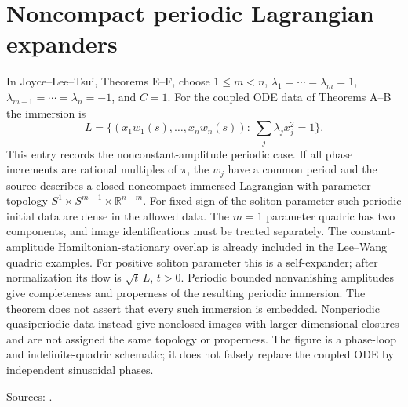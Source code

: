 \chapter{Noncompact periodic Lagrangian expanders}\label{sec:catalogue-jlt-mixed-periodic-expanders}
\begin{example}\label{ex:catalogue-jlt-mixed-periodic-expanders}
In Joyce--Lee--Tsui, Theorems E--F, choose $1\le m<n$, $\lambda_1=\cdots=\lambda_m=1$, $\lambda_{m+1}=\cdots=\lambda_n=-1$, and $C=1$. For the coupled ODE data of Theorems A--B the immersion is
\[
 L=\{(x_1w_1(s),\ldots,x_nw_n(s)):\ \sum_j\lambda_jx_j^2=1\}.
\]
This entry records the nonconstant-amplitude periodic case. If all phase increments are rational multiples of $\pi$, the $w_j$ have a common period and the source describes a closed noncompact immersed Lagrangian with parameter topology $S^1\times S^{m-1}\times\mathbb R^{n-m}$. For fixed sign of the soliton parameter such periodic initial data are dense in the allowed data. The $m=1$ parameter quadric has two components, and image identifications must be treated separately. The constant-amplitude Hamiltonian-stationary overlap is already included in the Lee--Wang quadric examples.
For positive soliton parameter this is a self-expander; after normalization its flow is $\sqrt t\,L$, $t>0$.
Periodic bounded nonvanishing amplitudes give completeness and properness of the resulting periodic immersion. The theorem does not assert that every such immersion is embedded. Nonperiodic quasiperiodic data instead give nonclosed images with larger-dimensional closures and are not assigned the same topology or properness. The figure is a phase-loop and indefinite-quadric schematic; it does not falsely replace the coupled ODE by independent sinusoidal phases.
\par Sources: \cite{CatJoyceLeeTsui2010}.
\end{example}

